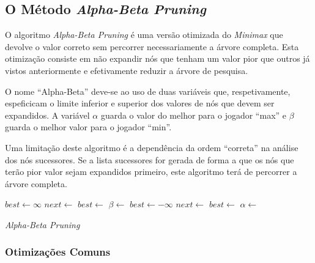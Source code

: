 \documentclass[12pt,a4paper,oneside]{article}
\begin{document}
\subsection{O Método \textit{Alpha-Beta Pruning}}

O algoritmo \emph{Alpha-Beta Pruning} é uma versão otimizada do
\textit{Minimax} que devolve o valor correto sem percorrer
necessariamente a árvore completa. Esta otimização consiste em não
expandir nós que tenham um valor pior que outros já vistos
anteriormente e efetivamente reduzir a árvore de pesquisa.

O nome ``Alpha-Beta'' deve-se ao uso de duas variáveis que,
respetivamente, espeficicam o limite inferior e superior dos valores
de nós que devem ser expandidos\cite{Russell:AI:2003}. A variável
$\alpha$ guarda o valor do melhor para o jogador ``max'' e $\beta$
guarda o melhor valor para o jogador ``min''.

Uma limitação deste algoritmo é a dependência da ordem ``correta'' na
análise dos nós sucessores. Se a lista sucessores for gerada de forma
a que os nós que terão pior valor sejam expandidos primeiro, este
algoritmo terá de percorrer a árvore completa.

\begin{algorithm}
\begin{algorithmic}
   
  \EndIf
      \State $best \gets \infty$
          \State $next \gets$ 
          \State $best \gets$ 
              \State{}
          \EndIf
          \State $\beta \gets$ 
      \EndFor
      \State $best \gets -\infty$
          \State $next \gets$ 
          \State $best \gets$ 
              \State{}
          \EndIf
          \State $\alpha \gets$ 
      \EndFor
  \EndIf
  \State{} 
\EndFunction
\end{algorithmic}
\caption{\emph{Alpha-Beta Pruning}}
\end{algorithm}

\subsubsection{Otimizações Comuns}
\end{document}
